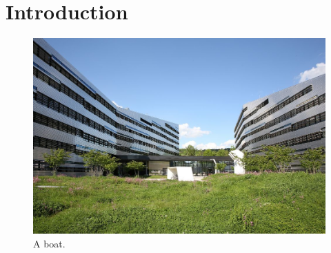 \section{Introduction}
\label{sec:introduction}


\lipsum[1-3] \cite{Turing1936}
\begin{figure}[h!]
\centering
  \includegraphics[width=0.8\linewidth]{figures/science_park.jpg}
  \caption{A boat.}
  \label{fig:boat1}
\end{figure}
\lipsum[4-6] 